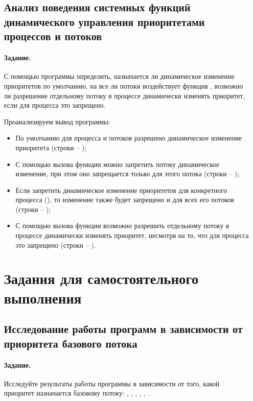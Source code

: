 \subsection{Анализ поведения системных функций динамического управления приоритетами процессов и потоков}

\paragraph{Задание.} С помощью программы определить, назначается ли динамическое изменение приоритетов по умолчанию, на все ли потоки воздействует функция , возможно ли разрешение отдельному потоку в процессе динамически изменять приоритет, если для процесса это запрещено.


Проанализируем вывод программы:

\begin{itemize}
	\item По умолчанию для процесса и потоков разрешено динамическое изменение приоритета (строки  -- );
	\item С помощью вызова функции  можно запретить потоку динамическое изменение, при этом оно запрещается только для этого потока (строки  -- );
	\item Если запретить динамическое изменение приоритетов для конкретного процесса (), то изменение также будет запрещено и для всех его потоков (строки  -- );
	\item С помощью вызова функции  возможно разрешить отдельному потоку в процессе динамически изменять приоритет, несмотря на то, что для процесса это запрещено (строки  -- ).
\end{itemize}

\newpage

\section{Задания для самостоятельного выполнения}

\subsection{Исследование работы программ в зависимости от приоритета базового потока}

\paragraph{Задание.} Исследуйте результаты работы программы  в зависимости от того, какой приоритет назначается базовому потоку: , , , , , .

